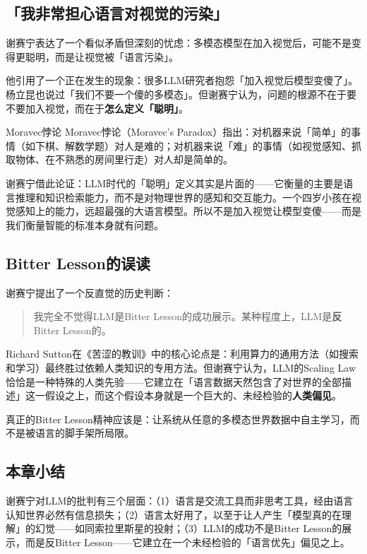 \documentclass[a4paper]{article}
\begin{document}
\subsection{「我非常担心语言对视觉的污染」}

谢赛宁表达了一个看似矛盾但深刻的忧虑：多模态模型在加入视觉后，可能不是变得更聪明，而是让视觉被「语言污染」。

他引用了一个正在发生的现象：很多LLM研究者抱怨「加入视觉后模型变傻了」。杨立昆也说过「我们不要一个傻的多模态」。但谢赛宁认为，问题的根源不在于要不要加入视觉，而在于\textbf{怎么定义「聪明」}。

\begin{warningbox}{Moravec悖论}
Moravec悖论（Moravec's Paradox）指出：对机器来说「简单」的事情（如下棋、解数学题）对人是难的；对机器来说「难」的事情（如视觉感知、抓取物体、在不熟悉的房间里行走）对人却是简单的。

谢赛宁借此论证：LLM时代的「聪明」定义其实是片面的——它衡量的主要是语言推理和知识检索能力，而不是对物理世界的感知和交互能力。一个四岁小孩在视觉感知上的能力，远超最强的大语言模型。所以不是加入视觉让模型变傻——而是我们衡量智能的标准本身就有问题。
\end{warningbox}

\subsection{Bitter Lesson的误读}

谢赛宁提出了一个反直觉的历史判断：

\begin{quote}
我完全不觉得LLM是Bitter Lesson的成功展示。某种程度上，LLM是\textbf{反}Bitter Lesson的。
\end{quote}

Richard Sutton在《苦涩的教训》中的核心论点是：利用算力的通用方法（如搜索和学习）最终胜过依赖人类知识的专用方法。但谢赛宁认为，LLM的Scaling Law恰恰是一种特殊的人类先验——它建立在「语言数据天然包含了对世界的全部描述」这一假设之上，而这个假设本身就是一个巨大的、未经检验的\textbf{人类偏见}。

真正的Bitter Lesson精神应该是：让系统从任意的多模态世界数据中自主学习，而不是被语言的脚手架所局限。

\subsection{本章小结}
谢赛宁对LLM的批判有三个层面：（1）语言是交流工具而非思考工具，经由语言认知世界必然有信息损失；（2）语言太好用了，以至于让人产生「模型真的在理解」的幻觉——如同索拉里斯星的投射；（3）LLM的成功不是Bitter Lesson的展示，而是反Bitter Lesson——它建立在一个未经检验的「语言优先」偏见之上。
\end{document}
